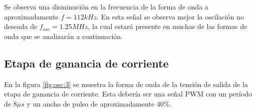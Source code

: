 Se observa una disminución en la frecuencia de la forma de onda a aproximadamente $f=112kHz$. 
En esta señal se observa mejor la oscilación no deseada de $f_{osc}=1.25MHz$, 
la cual estará presente en muchas de las formas de onda que se analizarán a continuación. 






\subsection{Etapa de ganancia de corriente}





En la figura \ref{fig:osc:3} se muestra la forma de onda de la tensión de salida de la etapa de ganancia de corriente.
Esta debería ser una señal PWM con un período de $8\mu s$ y un ancho de pulso de aproximadamente 40\%.

